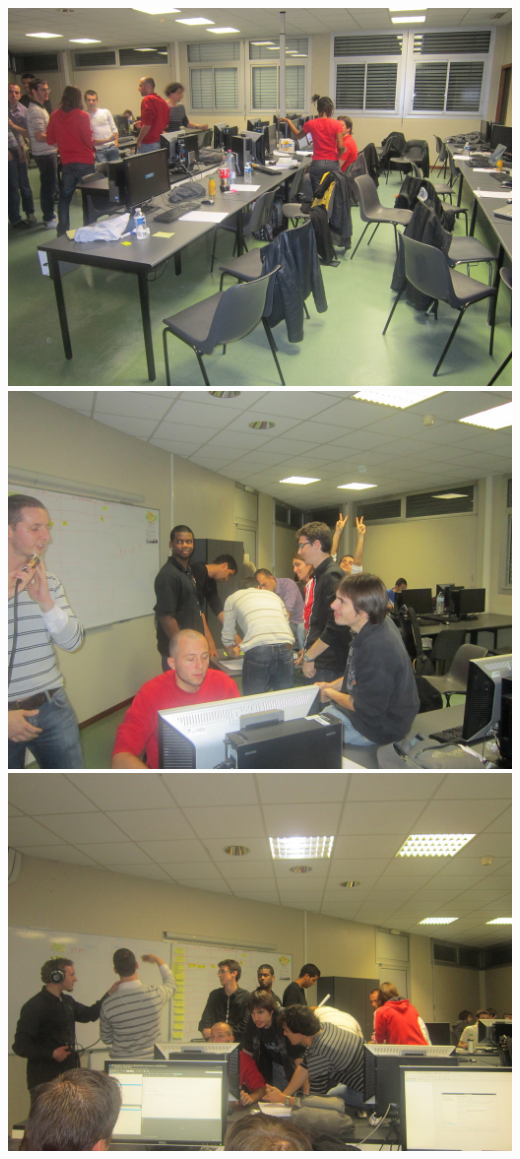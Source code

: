 \documentclass[a4paper,francais,titlepage]{report}
\begin{document}
\begin{center}
\includegraphics[scale=0.3]{brainstorming3.jpeg}
\\
\includegraphics[scale=0.3]{brainstorming4.jpeg}
\includegraphics[scale=0.3]{brainstorming5.jpeg}

\end{center}
\end{document}

